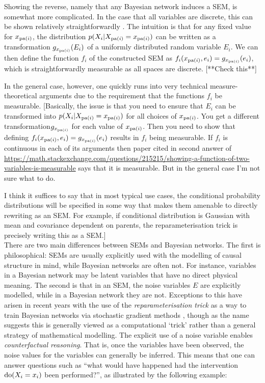 Showing the reverse, namely that any Bayesian network induces a SEM, is somewhat more complicated. In the case that all variables are discrete, this can be shown relatively straightforwardly \cite{druzdzel1993causality}. The intuition is that for any fixed value for $x_{\operatorname{pa}(i)}$,  the distribution $p(X_i | X_{\operatorname{pa}(i)}=x_{\operatorname{pa}(i)})$ can be written as a transformation $g_{x_{\operatorname{pa}(i)}}(E_i)$ of a uniformly distributed random variable $E_i$. We can then define the function $f_i$ of the constructed SEM as $f_i(x_{\operatorname{pa}(i)}, e_i) = g_{x_{\operatorname{pa}(i)}}(e_i)$, which is straightforwardly measurable as all spaces are discrete. [**Check this**]

In the general case, however, one quickly runs into very technical measure-theoretical arguments due to the requirement that the functions $f_i$ be measurable. [Basically, the issue is that you need to ensure that $E_i$ can be transformed into $p(X_i | X_{\operatorname{pa}(i)}=x_{\operatorname{pa}(i)})$ for all choices of $x_{\operatorname{pa}(i)}$. You get a different transformation$g_{x_{\operatorname{pa}(i)}}$ for each value of $x_{\operatorname{pa}(i)}$. Then you need to show that defining $f_i(x_{\operatorname{pa}(i)}, e_i) = g_{x_{\operatorname{pa}(i)}}(e_i)$ results in $f_i$ being measurable. If $f_i$ is continuous in each of its arguments then paper cited in second answer of \url{https://math.stackexchange.com/questions/215215/showing-a-function-of-two-variables-is-measurable} says that it is measurable. But in the general case I'm not sure what to do. 

I think it suffices to say that in most typical use cases, the conditional probability distributions will be specified in some way that makes them amenable to directly rewriting as an SEM. For example, if conditional distribution is Gaussian with mean and covariance dependent on parents, the reparameterisation trick is precisely writing this as a SEM.]
\\

\noindent
There are two main differences between SEMs and Bayesian networks.
The first is philosophical: SEMs are usually explicitly used with the modelling of causal structure in mind, while Bayesian networks are often not. For instance, variables in a Bayesian network may be latent variables that have no direct physical meaning.
The second is that in an SEM, the noise variables $E$ are explicitly modelled, while in a Bayesian network they are not. Exceptions to this have arisen in recent years with the use of the \emph{reparameterisation trick} as a way to train Bayesian networks via stochastic gradient methods \citep{kingma, rezende}, though as the name suggests this is generally viewed as a computational `trick' rather than a general strategy of mathematical modelling.
The explicit use of a noise variable enables \emph{counterfactual reasoning}. That is, once the variables have been observed, the noise values for the variables can generally be inferred. This means that one can answer questions such as ``what would have happened had the intervention $\operatorname{do}(X_i=x_i)$ been performed?'', as illustrated by the following example:

